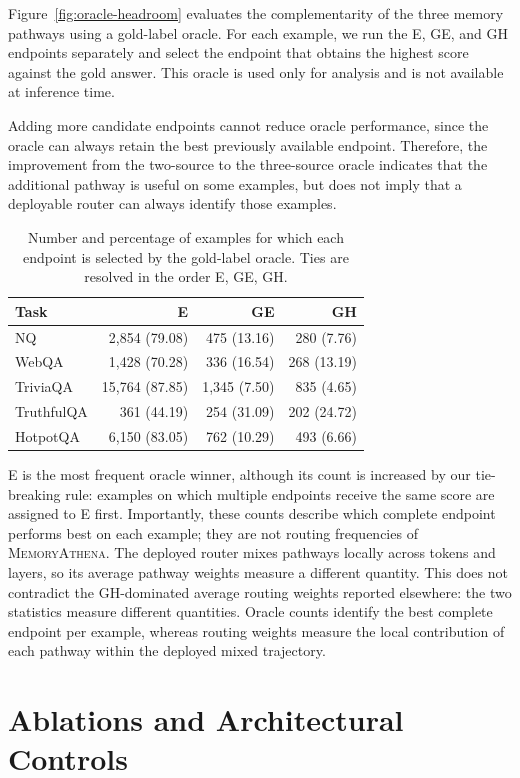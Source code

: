 Figure~\ref{fig:oracle-headroom} evaluates the complementarity of the three
memory pathways using a gold-label oracle. For each example, we run the E, GE,
and GH endpoints separately and select the endpoint that obtains the highest
score against the gold answer. This oracle is used only for analysis and is
not available at inference time.

Adding more candidate endpoints cannot reduce oracle performance, since the
oracle can always retain the best previously available endpoint. Therefore,
the improvement from the two-source to the three-source oracle indicates that
the additional pathway is useful on some examples, but does not imply that a
deployable router can always identify those examples.

\begin{table}[h]
\centering
\caption{
Number and percentage of examples for which each endpoint is selected by the
gold-label oracle. Ties are resolved in the order E, GE, GH.
}
\begin{tabular}{lrrr}
\toprule
Task & E & GE & GH\\
\midrule
NQ &2,854 (79.08)&475 (13.16)&280 (7.76)\\
WebQA &1,428 (70.28)&336 (16.54)&268 (13.19)\\
TriviaQA &15,764 (87.85)&1,345 (7.50)&835 (4.65)\\
TruthfulQA &361 (44.19)&254 (31.09)&202 (24.72)\\
HotpotQA &6,150 (83.05)&762 (10.29)&493 (6.66)\\
\bottomrule
\end{tabular}
\end{table}

E is the most frequent oracle winner, although its count is increased by our
tie-breaking rule: examples on which multiple endpoints receive the same score
are assigned to E first. Importantly, these counts describe which complete
endpoint performs best on each example; they are not routing frequencies of
\textsc{MemoryAthena}. The deployed router mixes pathways locally across
tokens and layers, so its average pathway weights measure a different quantity. This does not contradict the GH-dominated average routing weights reported
elsewhere: the two statistics measure different quantities. Oracle counts
identify the best complete endpoint per example, whereas routing weights measure
the local contribution of each pathway within the deployed mixed trajectory.
\section{Ablations and Architectural Controls}
\label{app:ablations}

